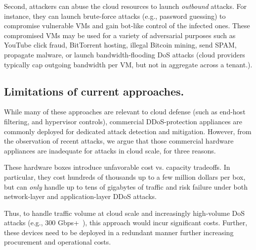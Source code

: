 Second, attackers can abuse the cloud resources to launch \emph{outbound} attacks.
For instance, they can launch brute-force attacks (e.g., password guessing) to 
compromise vulnerable VMs 
and gain bot-like control of the infected ones.
%
These compromised VMs may be used for a variety of adversarial purposes such as
YouTube click fraud, BitTorrent hosting, illegal Bitcoin
mining, send SPAM, propagate malware, or launch bandwidth-flooding DoS attacks
(cloud providers typically cap outgoing bandwidth per VM, but not in aggregate across a tenant.).

\subsection{Limitations of current approaches.}
%
While many of these approaches are relevant to cloud defense (such as
end-host filtering, and hypervisor controls), commercial DDoS-protection
 appliances are commonly deployed for dedicated attack detection and mitigation. 
However, from the observation of recent attacks, we argue that those commercial hardware appliances 
are inadequate for attacks in cloud scale, for
three reasons.


 These hardware boxes introduce unfavorable cost
vs. capacity tradeoffs. In particular, they cost hundreds of thousands
up to a few million dollars per box, but can {\em only} handle up to
tens of gigabytes of traffic and risk failure under both network-layer
and application-layer DDoS attacks.
~\cite{ADC}

Thus, to handle
traffic volume at cloud scale and increasingly high-volume DoS attacks 
(e.g., 300 Gbps+~\cite{Q4report}), this approach would incur significant costs. Further, these devices
need to be deployed in a redundant manner further increasing procurement and 
operational costs. 

